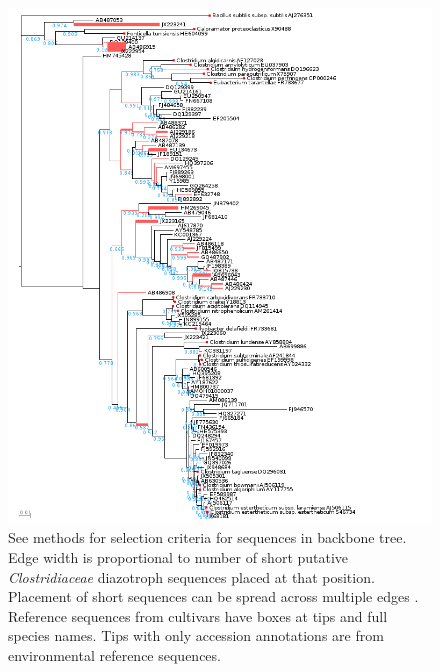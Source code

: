 \begin{figure}[h!]
  \centering
    \includegraphics[width=1.0\textwidth]{figures/clost.tree/clost_tree.png}
  \caption{See methods for selection criteria for sequences in backbone tree. Edge width is proportional to number of short putative \textit{Clostridiaceae} diazotroph sequences placed at that position. Placement of short sequences can be spread across multiple edges \cite{Matsen_2010}. Reference sequences from cultivars have boxes at tips and full species names. Tips with only accession annotations are from environmental reference sequences.}
  \label{fig:clost_tree}
\end{figure}

